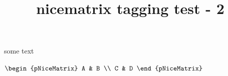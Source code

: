 \documentclass{article}
\title{nicematrix tagging test - 2}
\begin{document}
some text

$\begin{pNiceMatrix}
A & B \\
C & D
\end{pNiceMatrix}$
\end{document}
